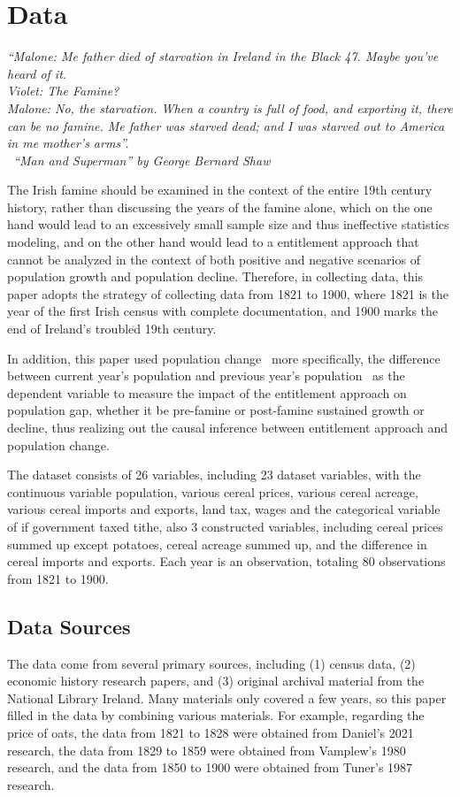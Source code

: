 \chapter{Data}

\textit{
``Malone: Me father died of starvation in Ireland in the Black 47. Maybe you've heard of it.\\
Violet: The Famine?\\
Malone: No, the starvation. When a country is full of food, and exporting it, there can be no famine. Me father was starved dead; and I was starved out to America in me mother's arms''.\\
\textemdash\ ``Man and Superman'' by George Bernard Shaw
}
\vspace{.2cm}

The Irish famine should be examined in the context of the entire 19th century history, rather than discussing the years of the famine alone, which on the one hand would lead to an excessively small sample size and thus ineffective statistics modeling, and on the other hand would lead to a entitlement approach that cannot be analyzed in the context of both positive and negative scenarios of population growth and population decline. Therefore, in collecting data, this paper adopts the strategy of collecting data from 1821 to 1900, where 1821 is the year of the first Irish census with complete documentation, and 1900 marks the end of Ireland's troubled 19th century.

In addition, this paper used population change \textendash\ more specifically, the difference between current year's population and previous year's population \textendash\ as the dependent variable to measure the impact of the entitlement approach on population gap, whether it be pre-famine or post-famine sustained growth or decline, thus  realizing out the causal inference between entitlement approach and population change.

The dataset consists of 26 variables, including 23 dataset variables, with the continuous variable population, various cereal prices, various cereal acreage, various cereal imports and exports, land tax, wages and the categorical variable of if government taxed tithe, also 3 constructed variables, including cereal prices summed up except potatoes, cereal acreage summed up, and the difference in cereal imports and exports. Each year is an observation, totaling 80 observations from 1821 to 1900.

\section{Data Sources}
\vspace{0pt}
The data come from several primary sources, including (1) census data, (2) economic history research papers, and (3) original archival material from the National Library Ireland. Many materials only covered a few years, so this paper filled in the data by combining various materials. For example, regarding the price of oats, the data from 1821 to 1828 were obtained from Daniel's 2021 research, the data from 1829 to 1859 were obtained from Vamplew's 1980 research, and the data from 1850 to 1900 were obtained from Tuner's 1987 research. 

